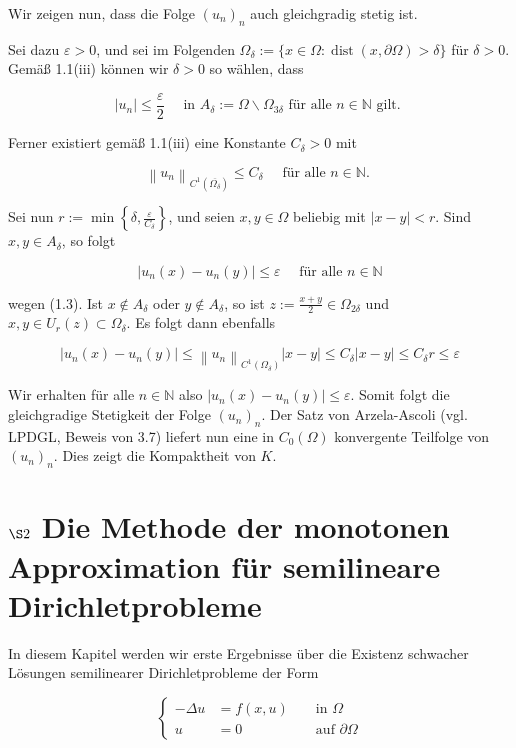 \documentclass[10pt, letterpaper]{article}
\begin{document}
Wir zeigen nun, dass die Folge $\left(u_{n}\right)_{n}$ auch gleichgradig stetig ist.

Sei dazu $\varepsilon>0$, und sei im Folgenden $\Omega_{\delta}:=\{x \in \Omega: \operatorname{dist}(x, \partial \Omega)>\delta\}$ für $\delta>0$. Gemäß 1.1(iii) können wir $\delta>0$ so wählen, dass

$$
\left|u_{n}\right| \leq \frac{\varepsilon}{2} \quad \text { in } A_{\delta}:=\Omega \backslash \Omega_{3 \delta} \text { für alle } n \in \mathbb{N} \text { gilt. }
$$

Ferner existiert gemäß 1.1(iii) eine Konstante $C_{\delta}>0$ mit

$$
\left\|u_{n}\right\|_{C^{1}\left(\overline{\Omega_{\delta}}\right)} \leq C_{\delta} \quad \text { für alle } n \in \mathbb{N} \text {. }
$$

Sei nun $r:=\min \left\{\delta, \frac{\varepsilon}{C_{\delta}}\right\}$, und seien $x, y \in \Omega$ beliebig mit $|x-y|<r$. Sind $x, y \in A_{\delta}$, so folgt

$$
\left|u_{n}(x)-u_{n}(y)\right| \leq \varepsilon \quad \text { für alle } n \in \mathbb{N}
$$

wegen (1.3). Ist $x \notin A_{\delta}$ oder $y \notin A_{\delta}$, so ist $z:=\frac{x+y}{2} \in \Omega_{2 \delta}$ und $x, y \in U_{r}(z) \subset \Omega_{\delta}$. Es folgt dann ebenfalls

$$
\left|u_{n}(x)-u_{n}(y)\right| \leq\left\|u_{n}\right\|_{C^{1}\left(\Omega_{\delta}\right)}|x-y| \leq C_{\delta}|x-y| \leq C_{\delta} r \leq \varepsilon
$$

Wir erhalten für alle $n \in \mathbb{N}$ also $\left|u_{n}(x)-u_{n}(y)\right| \leq \varepsilon$. Somit folgt die gleichgradige Stetigkeit der Folge $\left(u_{n}\right)_{n}$. Der Satz von Arzela-Ascoli (vgl. LPDGL, Beweis von 3.7) liefert nun eine in $C_{0}(\Omega)$ konvergente Teilfolge von $\left(u_{n}\right)_{n}$. Dies zeigt die Kompaktheit von $K$.



\section*{$\S 2$ Die Methode der monotonen Approximation für semilineare Dirichletprobleme}

In diesem Kapitel werden wir erste Ergebnisse über die Existenz schwacher Lösungen semilinearer Dirichletprobleme der Form

$$
\left\{\begin{aligned}
-\Delta u & =f(x, u) & & \text { in } \Omega \\
u & =0 & & \text { auf } \partial \Omega
\end{aligned}\right.
$$
\end{document}
